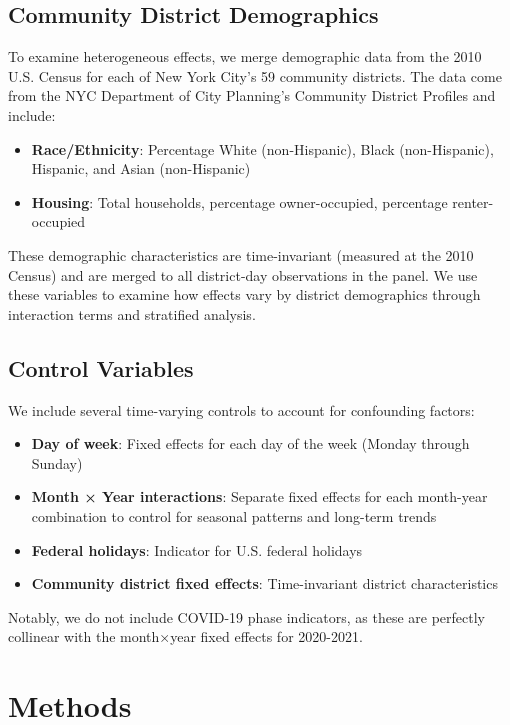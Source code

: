 \documentclass[11pt,a4paper]{article}
\begin{document}
\subsection{Community District Demographics}

To examine heterogeneous effects, we merge demographic data from the 2010 U.S. Census for each of New York City's 59 community districts. The data come from the NYC Department of City Planning's Community District Profiles and include:

\begin{itemize}
    \item \textbf{Race/Ethnicity}: Percentage White (non-Hispanic), Black (non-Hispanic), Hispanic, and Asian (non-Hispanic)
    \item \textbf{Housing}: Total households, percentage owner-occupied, percentage renter-occupied
\end{itemize}

These demographic characteristics are time-invariant (measured at the 2010 Census) and are merged to all district-day observations in the panel. We use these variables to examine how effects vary by district demographics through interaction terms and stratified analysis.

\subsection{Control Variables}

We include several time-varying controls to account for confounding factors:

\begin{itemize}
    \item \textbf{Day of week}: Fixed effects for each day of the week (Monday through Sunday)
    \item \textbf{Month × Year interactions}: Separate fixed effects for each month-year combination to control for seasonal patterns and long-term trends
    \item \textbf{Federal holidays}: Indicator for U.S. federal holidays
    \item \textbf{Community district fixed effects}: Time-invariant district characteristics
\end{itemize}

Notably, we do not include COVID-19 phase indicators, as these are perfectly collinear with the month×year fixed effects for 2020-2021.

\section{Methods}
\end{document}
